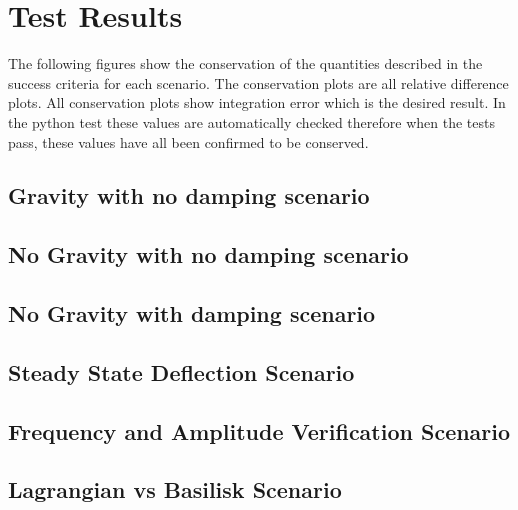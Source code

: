 \section{Test Results}

The following figures show the conservation of the quantities described in the success criteria for each scenario. The conservation plots are all relative difference plots. All conservation plots show integration error which is the desired result. In the python test these values are automatically checked therefore when the tests pass, these values have all been confirmed to be conserved. 

\subsection{Gravity with no damping scenario}




\clearpage

\subsection{No Gravity with no damping scenario}






\clearpage

\subsection{No Gravity with damping scenario}





\clearpage

\subsection{Steady State Deflection Scenario}


\clearpage

\subsection{Frequency and Amplitude Verification Scenario}


\subsection{Lagrangian vs Basilisk Scenario}





\clearpage
